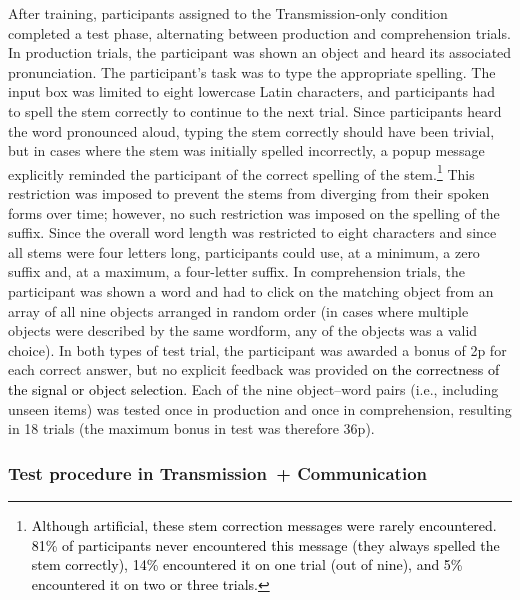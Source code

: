 \documentclass[doc,biblatex]{apa7}
\newcommand\firstrevision[1]{\textcolor{black}{#1}}
\begin{document}
After training, participants assigned to the Transmission-only condition completed a test phase, alternating between production and comprehension trials. In production trials, the participant was shown an object and heard its associated pronunciation. The participant's task was to type the appropriate spelling. The input box was limited to eight lowercase Latin characters, and participants had to spell the stem correctly to continue to the next trial. Since participants heard the word pronounced aloud, typing the stem correctly should have been trivial, but in cases where the stem was initially spelled incorrectly, a popup message explicitly reminded the participant of the correct spelling of the stem.\footnote{\firstrevision{Although artificial, these stem correction messages were rarely encountered. 81\% of participants never encountered this message (they always spelled the stem correctly), 14\% encountered it on one trial (out of nine), and 5\% encountered it on two or three trials.}} This restriction was imposed to prevent the stems from diverging from their spoken forms over time; however, no such restriction was imposed on the spelling of the suffix. Since the overall word length was restricted to eight characters and since all stems were four letters long, participants could use, at a minimum, a zero suffix and, at a maximum, a four-letter suffix. In comprehension trials, the participant was shown a word and had to click on the matching object from an array of all nine objects arranged in random order (in cases where multiple objects were described by the same wordform, any of the objects was a valid choice). In both types of test trial, the participant was awarded a bonus of 2p for each correct answer, but no explicit feedback was provided \firstrevision{on the correctness of the signal or object selection}. Each of the nine object--word pairs (i.e., including unseen items) was tested once in production and once in comprehension, resulting in 18 trials (the maximum bonus in test was therefore 36p).

\subsubsection{Test procedure in Transmission~+ Communication}
\end{document}
